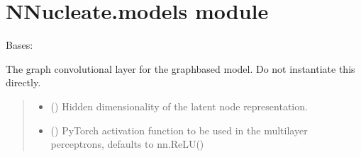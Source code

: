 \documentclass[a4paper,10pt,english]{report}
\begin{document}
\chapter{NNucleate.models module}
\label{\detokenize{NNucleate:module-NNucleate.models}}\label{\detokenize{NNucleate:nnucleate-models-module}}

\begin{fulllineitems}
\label{\detokenize{NNucleate:NNucleate.models.GCL}}
\pysigstartsignatures
{}
\pysigstopsignatures
\sphinxAtStartPar
Bases: 

\sphinxAtStartPar
The graph convolutional layer for the graph\sphinxhyphen{}based model. Do not instantiate this directly.
\begin{quote}\begin{description}
\begin{itemize}
\item {} 
\sphinxAtStartPar
{} () \textendash{} Hidden dimensionality of the latent node representation.

\item {} 
\sphinxAtStartPar
{} (\sphinxstyleliteralemphasis{\sphinxupquote{, }}) \textendash{} PyTorch activation function to be used in the multi\sphinxhyphen{}layer perceptrons, defaults to nn.ReLU()

\end{itemize}

\end{description}\end{quote}

\begin{fulllineitems}
\label{\detokenize{NNucleate:NNucleate.models.GCL.edge_model}}
\pysigstartsignatures
{}
\pysigstopsignatures
\end{fulllineitems}


\end{fulllineitems}
\end{document}
